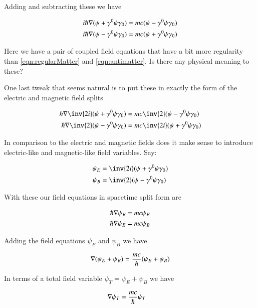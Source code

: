 \documentclass{article}
\begin{document}
Adding and subtracting these we have

\begin{align*}
i \hbar \nabla (\psi + \gamma^0 \psi \gamma_0) &= m c (\psi -\gamma^0 \psi \gamma_0) \\
i \hbar \nabla (\psi - \gamma^0 \psi \gamma_0) &= m c (\psi +\gamma^0 \psi \gamma_0)
\end{align*}

Here we have a pair of coupled field equations that have a bit more regularity than 
\ref{eqn:regularMatter} and \ref{eqn:antimatter}.  Is there any physical meaning to these?

One last tweak that seems natural is to put these in exactly the form of the electric and magnetic field splits

\begin{align*}
\hbar \grad \inv{2i} (\psi + \gamma^0 \psi \gamma_0) &= m c \inv{2} (\psi -\gamma^0 \psi \gamma_0) \\
\hbar \grad \inv{2} (\psi - \gamma^0 \psi \gamma_0) &= m c \inv{2i} (\psi +\gamma^0 \psi \gamma_0)
\end{align*}

In comparison to the electric and magnetic fields does it make sense to introduce electric-like and magnetic-like field variables.  Say:

\begin{align*}
\psi_E &= \inv{2i} (\psi + \gamma^0 \psi \gamma_0) \\
\psi_B &= \inv{2} (\psi - \gamma^0 \psi \gamma_0)
\end{align*}

With these our field equations in spacetime split form are

\begin{align*}
\hbar \nabla \psi_B &= m c \psi_E \\
\hbar \nabla \psi_E &= m c \psi_B \\
\end{align*}

Adding the field equations $\psi_E$ and $\psi_B$ we have

\begin{align*}
\nabla (\psi_E + \psi_B) &= \frac{m c}{\hbar} (\psi_E + \psi_B) \\ 
\end{align*}

In terms of a total field variable $\psi_T = \psi_E + \psi_B$ we have

\begin{align*}
\nabla \psi_T &= \frac{m c}{\hbar} \psi_T
\end{align*}
\end{document}
